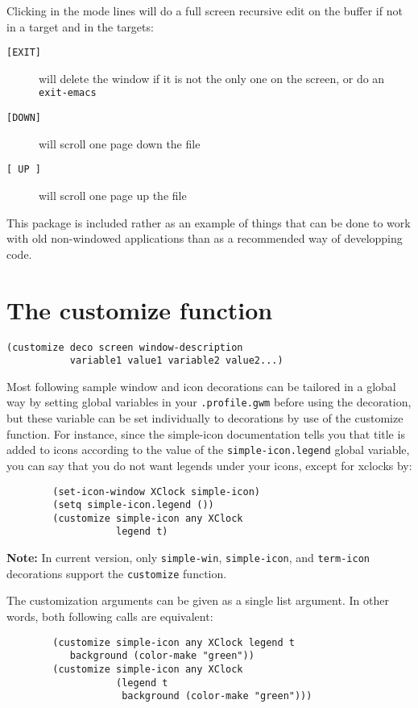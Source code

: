 Clicking in the mode lines will do a full screen recursive edit on the
buffer if not in a target and in the targets:

\begin{description}
\item[{\tt [EXIT]}] will delete the window if it is not the only one on
the screen, or do an {\tt exit-emacs}
\item[{\tt [DOWN]}] will scroll one page down the file
\item[{\tt [ UP ]}] will scroll one page up the file
\end{description}

This package is included rather as an example of things that can be done
to work with old non-windowed applications than as a recommended way of
developping code.

\section{The customize function}
\label{customize}

{\usagefont\begin{verbatim}
(customize deco screen window-description
           variable1 value1 variable2 value2...)
\end{verbatim}}\usageupspace

Most following sample window and icon decorations can be  tailored in a
global way by setting global variables in your \verb|.profile.gwm| before
using the decoration, but these variable can be set individually to
decorations by use of the customize function. For instance, since the
simple-icon documentation tells you that title is added to icons according to
the value of the \verb|simple-icon.legend| global variable, you can say that
you do not want legends under your icons, except for xclocks by:

{\exemplefont\begin{verbatim}
        (set-icon-window XClock simple-icon)
        (setq simple-icon.legend ())
        (customize simple-icon any XClock 
                   legend t)
\end{verbatim}}

{\bf Note:} In current version, only \verb|simple-win|, \verb|simple-icon|,
and \verb|term-icon| decorations support the \verb|customize| function.

The customization arguments can be given as a single list argument. In other
words, both following calls are equivalent:

{\exemplefont\begin{verbatim}
        (customize simple-icon any XClock legend t 
		   background (color-make "green"))
        (customize simple-icon any XClock 
                   (legend t 
                    background (color-make "green")))
		    
\end{verbatim}}

